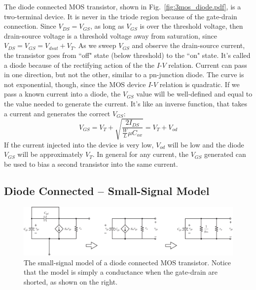 The diode connected MOS transistor, shown in Fig.~\ref{fig:3mos_diode.pdf}, is a two-terminal device.  It is never in the triode region because of the gate-drain connection.  Since $V_{DS} = V_{GS}$, as long as $V_{GS}$ is over the threshold voltage, then drain-source voltage is a threshold voltage away from saturation, since $V_{DS} = V_{GS} = V_{dsat} + V_T$.  As we sweep $V_{GS}$ and observe the drain-source current, the transistor goes from ``off" state (below threshold) to the ``on" state.  It's called a diode because of the rectifying action of the the $I$-$V$ relation. Current can pass in one direction, but not the other, similar to a pn-junction diode.  The curve is not exponential, though, since the MOS device $I$-$V$ relation is quadratic.  If we pass a known current into a diode, the $V_{GS}$ value will be well-defined and equal to the value needed to generate the current. It's like an inverse function, that takes a current and generates the correct $V_{GS}$:
%
\begin{equation}
	V_{GS} = V_T + \sqrt{\frac{2 I_{DS}}{\frac{W}{L} \mu C_{ox}}} = V_T + V_{od}
\end{equation}
%
If the current injected into the device is very low, $V_{od}$ will be low and the diode $V_{GS}$ will be approximately $V_T$.  In general for any current, the $V_{GS}$ generated can be used to bias a second transistor into the same current. 





\subsection{Diode Connected -- Small-Signal Model}

\begin{figure}[tb]
\begin{center}
\includegraphics[width=\columnwidth]{4mos_diode_ss.pdf}
\end{center}
\caption{The small-signal model of a diode connected MOS transistor.  Notice that the model is simply a conductance when the gate-drain are shorted, as shown on the right.} \label{fig:4mos_diode_ss.pdf}
\end{figure}

